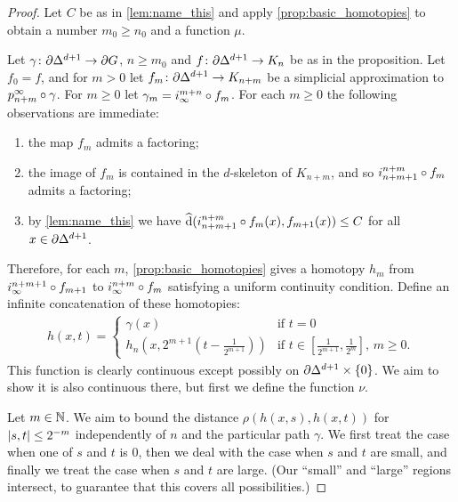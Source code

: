 \documentclass[a4paper]{article}
\begin{document}
\begin{proof}
  Let $C$ be as in \cref{lem:name_this} and apply \cref{prop:basic_homotopies}
  to obtain a number $m_0\geq n_0$ and a function $\mu$. 
  
  Let $\gamma\colon\partial\Delta^{d+1}\to\partial G$, $n\geq m_0$ and
  $f\colon\partial\Delta^{d+1}\to K_n$ be as in the proposition. Let $f_0 = f$,
  and for $m > 0$ let $f_m\colon\partial\Delta^{d+1}\to K_{n+m}$ be a
  simplicial approximation to $p^\infty_{n+m}\circ\gamma$. For $m \geq 0$
  let $\gamma_m = i^{m+n}_\infty\circ f_m$. For each $m\geq 0$ the
  following observations are immediate:
  \begin{enumerate}
    \item the map $f_m$ admits a factoring;
    \item the image of $f_m$ is contained in the $d$-skeleton of $K_{n+m}$, and
      so $i^{n+m}_{n+m+1}\circ f_m$ admits a factoring;
    \item by \cref{lem:name_this} we have $\operatorname{\widehat{d}}(i^{n+m}_{n+m+1}\circ
      f_m(x), f_{m+1}(x)) \leq C$ for all $x \in \partial\Delta^{d+1}$.
  \end{enumerate}
  Therefore, for each $m$, \cref{prop:basic_homotopies} gives a homotopy $h_m$
  from $i^{n+m+1}_\infty\circ f_{m+1}$ to $i^{n+m}_\infty \circ f_m$
  satisfying a uniform continuity condition. Define an infinite concatenation
  of these homotopies:
  \begin{align*}
    h(x,t) = 
    \begin{cases}
      \gamma(x) & \text{if } t = 0\\
      h_n\left(x,2^{m+1}\left(t-\frac{1}{2^{m+1}}\right)\right) 
              & \text{if $t \in \left[\frac{1}{2^{m+1}}, \frac{1}{2^m}\right]$
                    , $m\geq 0$}.
    \end{cases}
  \end{align*}
  This function is clearly continuous except possibly on
  $\partial\Delta^{d+1}\times\{0\}$. We aim to show it is also continuous
  there, but first we define the function $\nu$. 

  Let $m \in \mathbb{N}$. We aim to bound the distance $\rho(h(x,s), h(x,t))$
  for $\left|s,t\right| \leq 2^{-m}$ independently of $n$ and the particular path
  $\gamma$. We first treat the case when one of $s$ and $t$ is $0$, then we
  deal with the case when $s$ and $t$ are small, and finally we treat the case
  when $s$ and $t$ are large. (Our ``small'' and ``large'' regions intersect,
  to guarantee that this covers all possibilities.)


\end{proof}
\end{document}
